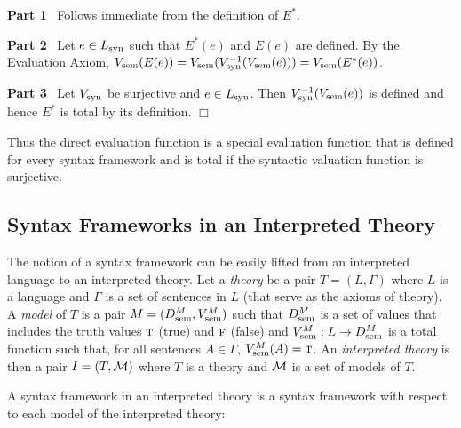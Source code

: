 \documentclass[11pt,fleqn]{article}
\newcommand{\sglsp}{\ }
\newcommand{\dblsp}{\ \ }
\newcommand{\sM}{\mbox{$\cal M$}}
\newcommand{\tarrow}{\rightarrow}
\newcommand{\TRUE}{\mbox{{\sc t}}}
\newcommand{\FALSE}{\mbox{{\sc f}}}
\newenvironment{proof}{\par\noindent{\bf Proof\dblsp}}{\hfill$\Box$}
\begin{document}
\begin{proof}

\bigskip

\noindent \textbf{Part 1} \sglsp Follows immediate from the definition
of $E^{\ast}$.

\bigskip

\noindent \textbf{Part 2} \sglsp Let $e \in L_{\rm syn}$ such that
$E^{\ast}(e)$ and $E(e)$ are defined.  By the Evaluation Axiom,
$V_{\rm sem}(E(e)) = V_{\rm sem}(V_{\rm syn}^{-1}(V_{\rm sem}(e))) =
V_{\rm sem}(E^{\ast}(e))$.

\bigskip

\noindent \textbf{Part 3} \sglsp Let $V_{\rm syn}$ be surjective and
$e \in L_{\rm syn}$.  Then $V_{\rm syn}^{-1}(V_{\rm sem}(e))$ is
defined and hence $E^{\ast}$ is total by its definition.
\end{proof}

\bigskip

Thus the direct evaluation function is a special evaluation function
that is defined for every syntax framework and is total if the
syntactic valuation function is surjective.

\subsection{Syntax Frameworks in an Interpreted Theory}

The notion of a syntax framework can be easily lifted from an
interpreted language to an interpreted theory.  Let a \emph{theory} be
a pair $T = (L,\Gamma)$ where $L$ is a language and $\Gamma$ is a set
of sentences in $L$ (that serve as the axioms of theory).  A
\emph{model} of $T$ is a pair $M = (D^{M}_{\rm sem},V^{M}_{\rm sem})$
such that $D^{M}_{\rm sem}$ is a set of values that includes the truth
values $\TRUE$ (true) and $\FALSE$ (false) and $V^{M}_{\rm sem} : L
\tarrow D^{M}_{\rm sem}$ is a total function such that, for all
sentences $A \in \Gamma$, $V^{M}_{\rm sem}(A) = \TRUE$.  An
\emph{interpreted theory} is then a pair $I=(T,\sM)$ where $T$ is a
theory and $\sM$ is a set of models of $T$.

A syntax framework in an interpreted theory is a syntax framework with
respect to each model of the interpreted theory:
\end{document}
